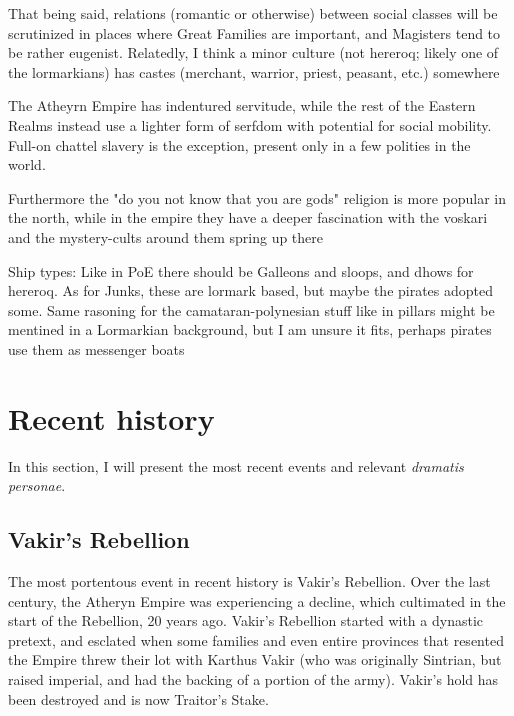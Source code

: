 That being said, relations (romantic or otherwise) between social classes will be scrutinized in places where Great Families are important, and Magisters tend to be rather eugenist. 
Relatedly, I think a minor culture (not hereroq; likely one of the lormarkians) has castes (merchant, warrior, priest, peasant, etc.) somewhere

The Atheyrn Empire has indentured servitude, while the rest of the Eastern Realms instead use a lighter form of serfdom with potential for social mobility. Full-on chattel slavery is the exception, present only in a few polities in the world.

Furthermore the "do you not know that you are gods" religion is more popular in the north, while in the empire they have a deeper fascination with the voskari and the mystery-cults around them spring up there




Ship types:
	Like in PoE there should be Galleons and sloops, and dhows for hereroq.
	As for Junks, these are lormark based, but maybe the pirates adopted some. Same rasoning for the camataran-polynesian stuff like in pillars might be mentined in a Lormarkian background, but I am unsure it fits, perhaps pirates use them as messenger boats





\section{Recent history}

\label{recent_history}

In this section, I will present the most recent events and relevant \textit{dramatis personae}.

\subsection{Vakir's Rebellion}

The most portentous event in recent history is Vakir's Rebellion. Over the last century, the Atheryn Empire was experiencing a decline, which cultimated in the start of the Rebellion, 20 years ago. Vakir's Rebellion started with a dynastic pretext, and esclated when some families and even entire provinces that resented the Empire threw their lot with Karthus Vakir (who was originally Sintrian, but raised imperial, and had the backing of a portion of the army). Vakir's hold has been destroyed and is now Traitor's Stake.


